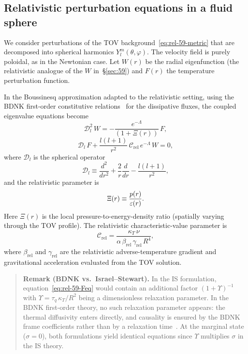 \subsection{Relativistic perturbation equations in a fluid sphere}
\label{sec:rel-59-pert}

We consider perturbations of the TOV background~\eqref{eq:rel-59-metric}
that are decomposed into spherical harmonics $Y_{l}^{m}(\theta,\varphi)$.
The velocity field is purely poloidal, as in the Newtonian case.  Let
$W(r)$ be the radial eigenfunction (the relativistic analogue of the
$W$ in~\S\ref{sec:59}) and $F(r)$ the temperature perturbation function.

In the Boussinesq approximation adapted to the relativistic setting,
using the BDNK first-order constitutive
relations~\cite{BemficaDN2018,Kovtun2019} for the dissipative fluxes,
the coupled eigenvalue equations become
\begin{equation}
\label{eq:rel-59-Weq}
\mathscr{D}_{l}^{2}\,W
  = -\frac{e^{-\Lambda}}{(1+\Xi(r))}\,F,
\end{equation}
\begin{equation}
\label{eq:rel-59-Feq}
\mathscr{D}_{l}\,F
  + \frac{l(l+1)}{r^{2}}\,\mathcal{C}_{\mathrm{rel}}\,
    e^{-\Lambda}\,W = 0,
\end{equation}
where $\mathscr{D}_{l}$ is the spherical operator
\begin{equation}
\label{eq:rel-59-Dlop}
\mathscr{D}_{l} \equiv
  \frac{d^{2}}{dr^{2}} + \frac{2}{r}\frac{d}{dr}
  - \frac{l(l+1)}{r^{2}},
\end{equation}
and the relativistic parameter is
\begin{equation}
\label{eq:rel-59-params}
\Xi(r) \equiv \frac{p(r)}{\varepsilon(r)}.
\end{equation}
Here $\Xi(r)$ is the local pressure-to-energy-density ratio (spatially varying
through the TOV profile).  The relativistic
characteristic-value parameter is
\begin{equation}
\label{eq:rel-59-Crel}
\mathcal{C}_{\mathrm{rel}} =
  \frac{\kappa_{T}\,\nu}{\alpha\,\beta_{\mathrm{rel}}\,
        \gamma_{\mathrm{rel}}\,R^{4}},
\end{equation}
where $\beta_{\mathrm{rel}}$ and $\gamma_{\mathrm{rel}}$ are the
relativistic adverse-temperature gradient and gravitational
acceleration evaluated from the TOV solution.

\begin{quote}
\textbf{Remark (BDNK vs.\ Israel--Stewart).}
In the IS formulation, equation~\eqref{eq:rel-59-Feq} would contain
an additional factor $(1 + \Upsilon)^{-1}$ with
$\Upsilon = \tau_{q}\,\kappa_{T}/R^{2}$ being a dimensionless
relaxation parameter.  In the BDNK first-order theory, no such
relaxation parameter appears: the thermal diffusivity enters directly,
and causality is ensured by the BDNK frame coefficients rather than
by a relaxation time~\cite{Kovtun2019,HoultKovtun2020}.  At the
marginal state ($\sigma = 0$), both formulations yield identical
equations since $\Upsilon$ multiplies $\sigma$ in the IS theory.
\end{quote}

